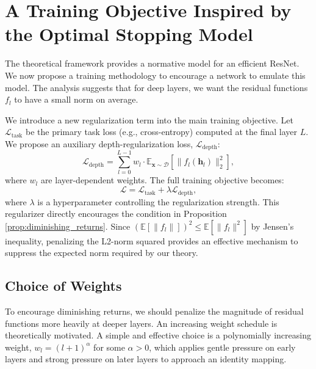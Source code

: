 \documentclass[12pt]{imsart}
\newcommand{\E}{\mathbb{E}}
\newcommand{\h}{\mathbf{h}}
\newcommand{\x}{\mathbf{x}}
\newcommand{\Ltask}{\mathcal{L}_{\text{task}}}
\newcommand{\Ldepth}{\mathcal{L}_{\text{depth}}}
\theoremstyle{plain}
\theoremstyle{definition}
\begin{document}
\section{A Training Objective Inspired by the Optimal Stopping Model}
\label{sec:objective}

The theoretical framework provides a normative model for an efficient ResNet. We now propose a training methodology to encourage a network to emulate this model. The analysis suggests that for deep layers, we want the residual functions $f_l$ to have a small norm on average.

We introduce a new regularization term into the main training objective. Let $\Ltask$ be the primary task loss (e.g., cross-entropy) computed at the final layer $L$. We propose an auxiliary depth-regularization loss, $\Ldepth$:
\begin{equation} \label{eq:depth_loss}
\Ldepth = \sum_{l=0}^{L-1} w_l \cdot \E_{\x \sim \mathcal{D}} [\|f_l(\h_l)\|_2^2],
\end{equation}
where $w_l$ are layer-dependent weights. The full training objective becomes:
\begin{equation}
\mathcal{L} = \Ltask + \lambda \Ldepth,
\end{equation}
where $\lambda$ is a hyperparameter controlling the regularization strength. This regularizer directly encourages the condition in Proposition \ref{prop:diminishing_returns}. Since $(\E[\|f_l\|])^2 \le \E[\|f_l\|^2]$ by Jensen's inequality, penalizing the L2-norm squared provides an effective mechanism to suppress the expected norm required by our theory.

\subsection{Choice of Weights} To encourage diminishing returns, we should penalize the magnitude of residual functions more heavily at deeper layers. An increasing weight schedule is theoretically motivated. A simple and effective choice is a polynomially increasing weight, $w_l = (l+1)^\alpha$ for some $\alpha > 0$, which applies gentle pressure on early layers and strong pressure on later layers to approach an identity mapping.

\end{document}
